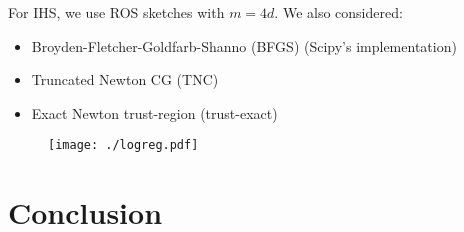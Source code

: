 \documentclass[12pt,letterpaper,boxed]{article}
\begin{document}
For IHS, we use ROS sketches with $m = 4d$. We also considered:
\begin{itemize}
  \item Broyden-Fletcher-Goldfarb-Shanno (BFGS) (Scipy's implementation)
  \item Truncated Newton CG (TNC)
  \item Exact Newton trust-region (trust-exact)
\end{itemize}


\begin{figure}[htpb]
  \centering
  \texttt{[image: ./logreg.pdf]}
  \caption{}
  \label{fig:}
\end{figure}

\section{Conclusion}

\printbibliography
\end{document}
